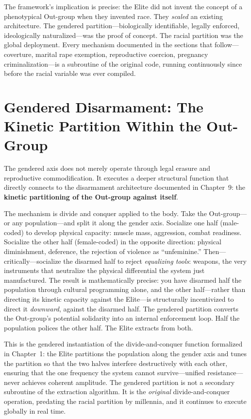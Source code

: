 \documentclass[12pt,openany]{book}
\begin{document}
The framework's implication is precise: the Elite did not invent the concept of a phenotypical Out-group when they invented race. They \textit{scaled} an existing architecture. The gendered partition---biologically identifiable, legally enforced, ideologically naturalized---was the proof of concept. The racial partition was the global deployment. Every mechanism documented in the sections that follow---coverture, marital rape exemption, reproductive coercion, pregnancy criminalization---is a subroutine of the original code, running continuously since before the racial variable was ever compiled.

\section{Gendered Disarmament: The Kinetic Partition Within the Out-Group}

The gendered axis does not merely operate through legal erasure and reproductive commodification. It executes a deeper structural function that directly connects to the disarmament architecture documented in Chapter~9: the \textbf{kinetic partitioning of the Out-group against itself}.

The mechanism is divide and conquer applied to the body. Take the Out-group---or any population---and split it along the gender axis. Socialize one half (male-coded) to develop physical capacity: muscle mass, aggression, combat readiness. Socialize the other half (female-coded) in the opposite direction: physical diminishment, deference, the rejection of violence as ``unfeminine.'' Then---critically---socialize the disarmed half to reject \textit{equalizing tools}: weapons, the very instruments that neutralize the physical differential the system just manufactured. The result is mathematically precise: you have disarmed half the population through cultural programming alone, and the other half---rather than directing its kinetic capacity against the Elite---is structurally incentivized to direct it \textit{downward}, against the disarmed half. The gendered partition converts the Out-group's potential solidarity into an internal enforcement loop. Half the population polices the other half. The Elite extracts from both.

This is the gendered instantiation of the divide-and-conquer function formalized in Chapter~1: the Elite partitions the population along the gender axis and tunes the partition so that the two halves interfere destructively with each other, ensuring that the one frequency the system cannot survive---unified resistance---never achieves coherent amplitude. The gendered partition is not a secondary subroutine of the extraction algorithm. It is the \textit{original} divide-and-conquer operation, predating the racial partition by millennia, and it continues to execute globally in real time.
\end{document}
